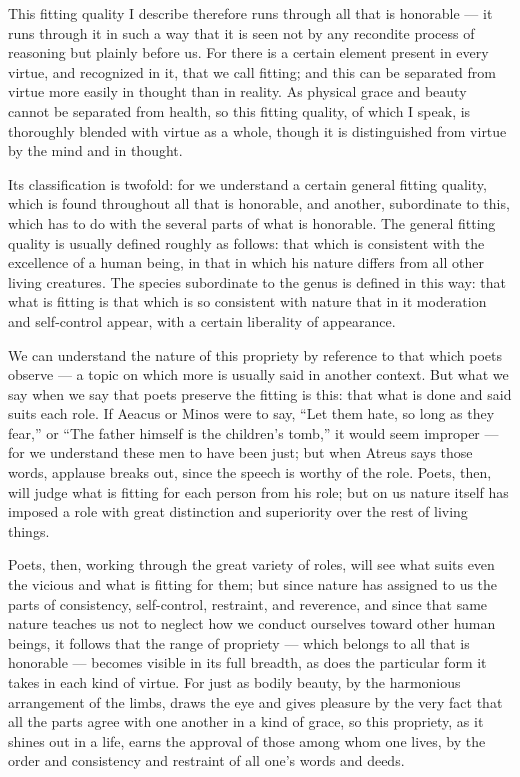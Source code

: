  This fitting quality I describe therefore runs through all that is honorable — it runs through it in such a way that it is seen not by any recondite process of reasoning but plainly before us. For there is a certain element present in every virtue, and recognized in it, that we call fitting; and this can be separated from virtue more easily in thought than in reality. As physical grace and beauty cannot be separated from health, so this fitting quality, of which I speak, is thoroughly blended with virtue as a whole, though it is distinguished from virtue by the mind and in thought.

 Its classification is twofold: for we understand a certain general fitting quality, which is found throughout all that is honorable, and another, subordinate to this, which has to do with the several parts of what is honorable. The general fitting quality is usually defined roughly as follows: that which is consistent with the excellence of a human being, in that in which his nature differs from all other living creatures. The species subordinate to the genus is defined in this way: that what is fitting is that which is so consistent with nature that in it moderation and self-control appear, with a certain liberality of appearance.

 We can understand the nature of this propriety by reference to that which poets observe — a topic on which more is usually said in another context. But what we say when we say that poets preserve the fitting is this: that what is done and said suits each role. If Aeacus or Minos were to say, ``Let them hate, so long as they fear,'' or ``The father himself is the children's tomb,'' it would seem improper — for we understand these men to have been just; but when Atreus says those words, applause breaks out, since the speech is worthy of the role. Poets, then, will judge what is fitting for each person from his role; but on us nature itself has imposed a role with great distinction and superiority over the rest of living things.

 Poets, then, working through the great variety of roles, will see what suits even the vicious and what is fitting for them; but since nature has assigned to us the parts of consistency, self-control, restraint, and reverence, and since that same nature teaches us not to neglect how we conduct ourselves toward other human beings, it follows that the range of propriety — which belongs to all that is honorable — becomes visible in its full breadth, as does the particular form it takes in each kind of virtue. For just as bodily beauty, by the harmonious arrangement of the limbs, draws the eye and gives pleasure by the very fact that all the parts agree with one another in a kind of grace, so this propriety, as it shines out in a life, earns the approval of those among whom one lives, by the order and consistency and restraint of all one's words and deeds.

